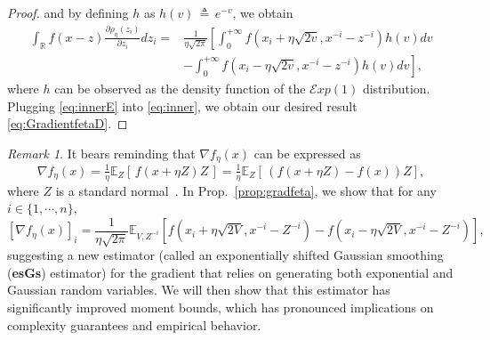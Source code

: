 \documentclass[11pt,reqno]{amsart}
\newcommand{\1}{{\bf 1}}
\newcommand{\2}{{\bf 2}}
\numberwithin{equation}{section}
\theoremstyle{remark}
\newtheorem{remark}{Remark}[section]
\begin{document}
\begin{proof}
		and by defining $h$ as $h(v) \, \triangleq \, e^{-v}$, we obtain 
		\begin{align}\label{eq:innerE}
			\int_{\mathbb{R}} f(x-z) {\tfrac{\partial\rho_\eta(z_i)}{\partial z_i}}dz_i=& \tfrac{1}{\eta\sqrt{2\pi}}\left[\int_{0}^{+\infty} f\left(x_i+\eta\sqrt{2v},x^{-i}-z^{-i}\right)h(v) dv \right. \nonumber\\
			&	\left. -\int_{0}^{+\infty} f\left(x_i-\eta\sqrt{2v},x^{-i}-z^{-i}\right)h(v) dv \right], 
		\end{align}
		where $h$ can be observed as the density function of the $\mathcal{E}xp(1)$ distribution. %
		Plugging \eqref{eq:innerE} into \eqref{eq:inner}, we obtain our desired result \eqref{eq:GradientfetaD}. 
		\end{proof}
		
		\begin{remark}
			{It bears reminding that $\nabla f_{\eta}(x)$ can be expressed as $$\nabla f_{\eta}(x) = \tfrac{1}{\eta} \mathbb{E}_{Z} \left[\, f(x+\eta Z) Z \, \right]= \tfrac{1}{\eta} \mathbb{E}_{Z} \left[\, (f(x+\eta Z) - f(x))Z \right],$$
				where $Z$ is a standard normal~\cite{nesterov2017random}. In Prop.~\ref{prop:gradfeta}, we show that  for any $i \in \{1, \cdots, n \}$, 
				$$[\nabla f_{\eta}(x)]_i = \frac{1}{\eta \sqrt{2\pi}}\mathbb{E}_{V,Z^{-i}}\left[f\left(x_i+\eta\sqrt{2V},x^{-i}-Z^{-i}\right)-f\left(x_i-\eta\sqrt{2V},x^{-i}-Z^{-i}\right)\right],$$ suggesting a new estimator (called an exponentially shifted Gaussian smoothing ({\bf esGs}) estimator) for the gradient that relies on generating both exponential and Gaussian random variables. We will then show that this estimator has significantly improved moment bounds, which has pronounced implications on complexity guarantees and empirical behavior.  }
		\end{remark}
\end{document}
